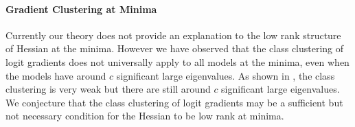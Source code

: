 \paragraph{Gradient Clustering at Minima}

Currently our theory does not provide an explanation to the low rank structure of Hessian at the minima. However we have observed that the class clustering of logit gradients does not universally apply to all models at the minima, even when the models have around $c$ significant large eigenvalues. As shown in , the class clustering is very weak but there are still around $c$ significant large eigenvalues. We conjecture that the class clustering of logit gradients may be a sufficient but not necessary condition for the Hessian to be low rank at minima.

